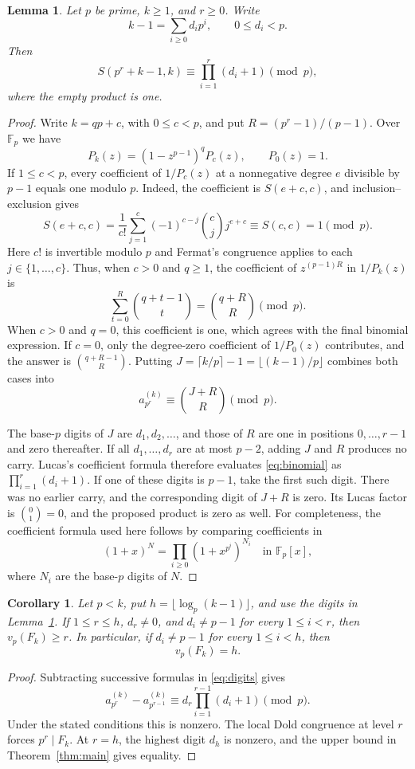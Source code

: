 \documentclass[11pt]{article}
\newtheorem{lemma}[theorem]{Lemma}
\newtheorem{corollary}[theorem]{Corollary}
\theoremstyle{remark}
\begin{document}
\begin{lemma}\label{lem:digits}
Let $p$ be prime, $k\geq1$, and $r\geq0$. Write
\[
 k-1=\sum_{i\geq0}d_i p^i,\qquad 0\leq d_i<p.
\]
Then
\begin{equation}\label{eq:digits}
 S(p^r+k-1,k)\equiv\prod_{i=1}^r(d_i+1)\pmod p,
\end{equation}
where the empty product is one.
\end{lemma}
\begin{proof}
Write $k=qp+c$, with $0\leq c<p$, and put $R=(p^r-1)/(p-1)$.
Over $\mathbb F_p$ we have
\[
 P_k(z)=(1-z^{p-1})^qP_c(z),\qquad P_0(z)=1.
\]
If $1\leq c<p$, every coefficient of $1/P_c(z)$ at a nonnegative
degree $e$ divisible by $p-1$ equals one modulo $p$. Indeed, the
coefficient is $S(e+c,c)$, and inclusion--exclusion gives
\[
 S(e+c,c)=\frac1{c!}\sum_{j=1}^c(-1)^{c-j}\binom cj j^{e+c}
 \equiv S(c,c)=1\pmod p.
\]
Here $c!$ is invertible modulo $p$ and Fermat's congruence applies to each
$j\in\{1,\ldots,c\}$.
Thus, when $c>0$ and $q\geq1$, the coefficient of $z^{(p-1)R}$ in
$1/P_k(z)$ is
\[
 \sum_{t=0}^R\binom{q+t-1}{t}=\binom{q+R}{R}\pmod p.
\]
When $c>0$ and $q=0$, this coefficient is one, which agrees with the final
binomial expression. If $c=0$, only the degree-zero coefficient of
$1/P_0(z)$ contributes, and the answer is $\binom{q+R-1}{R}$.
Putting
$J=\lceil k/p\rceil-1=\lfloor(k-1)/p\rfloor$ combines both cases into
\begin{equation}\label{eq:binomial}
 a_{p^r}^{(k)}\equiv\binom{J+R}{R}\pmod p.
\end{equation}

The base-$p$ digits of $J$ are $d_1,d_2,\ldots$, and those of $R$ are
one in positions $0,\ldots,r-1$ and zero thereafter.
If all $d_1,\ldots,d_r$ are at most $p-2$, adding $J$ and $R$ produces no
carry. Lucas's coefficient formula therefore evaluates
\eqref{eq:binomial} as $\prod_{i=1}^r(d_i+1)$.
If one of these digits is $p-1$, take the first such digit. There was no
earlier carry, and the corresponding digit of $J+R$ is zero. Its Lucas
factor is $\binom01=0$, and the proposed product is zero as well.
For completeness, the coefficient formula used here follows by comparing
coefficients in
\[
 (1+x)^N=\prod_{i\geq0}(1+x^{p^i})^{N_i}\quad\text{in }\mathbb F_p[x],
\]
where $N_i$ are the base-$p$ digits of $N$.
\end{proof}

\begin{corollary}\label{cor:sharp-digits}
Let $p<k$, put $h=\lfloor\log_p(k-1)\rfloor$, and use the digits in
Lemma~\ref{lem:digits}. If $1\leq r\leq h$, $d_r\ne0$, and
$d_i\ne p-1$ for every $1\leq i<r$, then $v_p(F_k)\geq r$.
In particular, if $d_i\ne p-1$ for every $1\leq i<h$, then
\[
 v_p(F_k)=h.
\]
\end{corollary}
\begin{proof}
Subtracting successive formulas in \eqref{eq:digits} gives
\[
 a_{p^r}^{(k)}-a_{p^{r-1}}^{(k)}
 \equiv d_r\prod_{i=1}^{r-1}(d_i+1)\pmod p.
\]
Under the stated conditions this is nonzero. The local Dold congruence at
level $r$ forces $p^r\mid F_k$. At $r=h$, the highest digit $d_h$ is
nonzero, and the upper bound in Theorem~\ref{thm:main} gives equality.
\end{proof}
\end{document}
